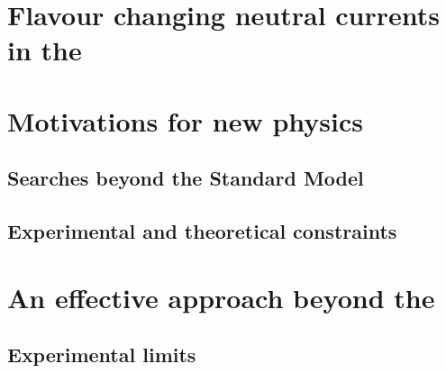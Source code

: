 \section{Flavour changing neutral currents in the \SM}

\section{Motivations for new physics}
\subsection{Searches beyond the Standard Model}
\subsection{Experimental and theoretical constraints}
\section{An effective approach beyond the \SM}
\subsection{Experimental limits}